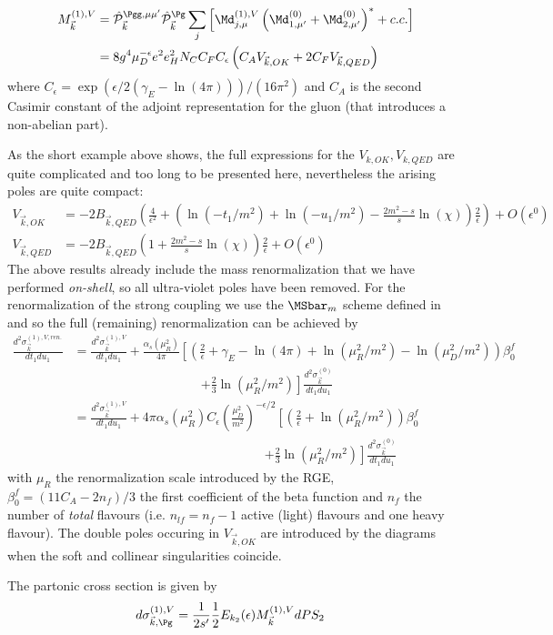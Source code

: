 
\begin{align}
M_{\vec k}^{(1),V}&=\hat {\mathcal P}_{\vec k}^{\Pgg,\mu\mu'}\hat {\mathcal P}_{\vec k}^{\Pg}\sum_{j}\left[\Md^{(1),V}_{j,\mu}\left(\Md^{(0)}_{1,\mu'}+\Md^{(0)}_{2,\mu'}\right)^*+c.c.\right] \nonumber\\
 &= 8g^4\mu_D^{-\epsilon}e^2e_H^2 N_C C_FC_\epsilon\left( C_A V_{\vec k,OK} + 2C_F V_{\vec k,QED}\right)
\end{align}
where $C_\epsilon = \exp(\epsilon/2(\gamma_E-\ln(4\pi)))/(16\pi^2)$ and $C_A$ is the second Casimir constant of the adjoint representation for the gluon (that introduces a non-abelian part).

As the short example above shows, the full expressions for the $V_{k,OK},V_{k,QED}$ are quite complicated and too long to be presented here, nevertheless the arising poles are quite compact:
\begin{align}
V_{\vec k,OK} &= -2B_{\vec k,QED}\left(\frac 4 {\epsilon^2} + \left(\ln(-t_1/m^2) + \ln(-u_1/m^2) -\frac{2m^2-s}{s}\ln(\chi)\right)\frac 2 \epsilon \right) + O(\epsilon^0)\\
V_{\vec k,QED} &= -2B_{\vec k,QED}\left(1+\frac{2m^2-s}{s}\ln(\chi)\right)\frac 2 \epsilon + O(\epsilon^0)
\end{align}
The above results already include the mass renormalization that we have performed \textit{on-shell}, so all ultra-violet poles have been removed. For the renormalization of the strong coupling we use the $\MSbar_m$ scheme defined in \cite{Bojak:2000eu} and so the full (remaining) renormalization can be achieved by
\begin{align}
\frac{d^2\sigma_{\vec k}^{(1),V,ren.}}{dt_1du_1} &=\frac{d^2\sigma_{\vec k}^{(1),V}}{dt_1du_1} + \frac{\alpha_s(\mu_R^2)}{4\pi}\left[\left(\frac 2 \epsilon + \gamma_E-\ln(4\pi)+\ln(\mu_R^2/m^2)-\ln(\mu_D^2/m^2)\right)\beta_0^f \right.\nonumber\\
 &\hspace{120pt}\left.+\frac 2 3 \ln(\mu_R^2/m^2)\right]\frac{d^2\sigma_{\vec k}^{(0)}}{dt_1du_1}\\
&=\frac{d^2\sigma_{\vec k}^{(1),V}}{dt_1du_1} + 4\pi\alpha_s(\mu_R^2)C_\epsilon\left(\frac{\mu_D^2}{m^2}\right)^{-\epsilon/2}\left[\left(\frac 2 \epsilon +\ln(\mu_R^2/m^2)\right)\beta_0^f \right.\nonumber\\
 &\hspace{180pt}\left.+\frac 2 3 \ln(\mu_R^2/m^2)\right]\frac{d^2\sigma_{\vec k}^{(0)}}{dt_1du_1}
\end{align}
with $\mu_R$ the renormalization scale introduced by the RGE, $\beta_0^f = (11C_A- 2n_{f})/3$ the first coefficient of the beta function and $n_f$ the number of \textit{total} flavours (i.e. $n_{lf}=n_f-1$ active (light) flavours and one heavy flavour). The double poles occuring in $V_{\vec k,OK}$ are introduced by the diagrams  when the soft and collinear singularities coincide.

The partonic cross section is given by
\begin{align}
d\sigma_{\vec k,\Pg}^{(1),V} &= \frac 1 {2s'}\frac 1 2 E_{k_2}(\epsilon) M_{\vec k}^{(1),V} dPS_2
\end{align}

